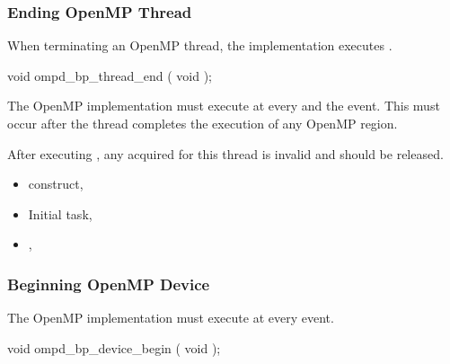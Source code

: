 \subsubsection{Ending OpenMP Thread}
\label{subsubsec:ompd_bp_thread_begin}

\summary

When terminating an OpenMP thread, the implementation 
executes .

\format
\begin{cspecific}
\begin{ompSyntax}
void ompd_bp_thread_end ( void );
\end{ompSyntax}
\end{cspecific}


\descr

The OpenMP implementation must execute 
 at every  and the  event.
This must occur after the thread completes the execution of any OpenMP region.

After 
executing , any  acquired for this thread 
is invalid and should be released.


\crossreferences
\begin{itemize}
\item
   construct, 
\item
  Initial task, 
\item
  , 
\end{itemize}






\subsubsection{Beginning OpenMP Device}
\label{subsubsec:ompd_bp_device_begin}

\summary
The OpenMP implementation must execute 
 at every  event.


\format
\begin{cspecific}
\begin{ompSyntax}
void ompd_bp_device_begin ( void );
\end{ompSyntax}
\end{cspecific}


